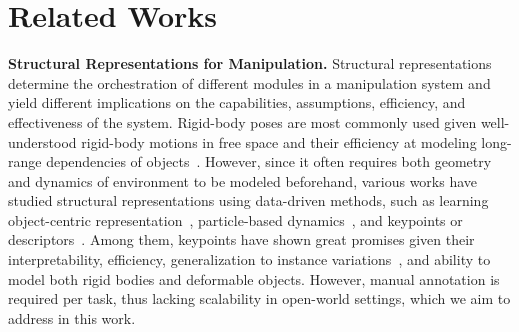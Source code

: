 \section{Related Works}
\label{sec:related}

\textbf{Structural Representations for Manipulation.}
Structural representations determine the orchestration of different modules in a manipulation system and yield different implications on the capabilities, assumptions, efficiency, and effectiveness of the system.
Rigid-body poses are most commonly used given well-understood rigid-body motions in free space and their efficiency at modeling long-range dependencies of objects~\cite{kaelbling2010hierarchical,kaelbling2013integrated,srivastava2014combined,byravan2017se3,dantam2018incremental,migimatsu2020object,garrett2021integrated,curtis2022long,labbe2022megapose,tyree20226,pan2023tax,wen2023foundationpose}.
However, since it often requires both geometry and dynamics of environment to be modeled beforehand, various works have studied structural representations using data-driven methods, such as learning object-centric representation~\cite{lenz2015deepmpc,chang2016compositional,battaglia2016interaction,sanchez2018graph,jang2018grasp2vec,tremblay2018deep,xu2019densephysnet,mao2019neuro,burgess2019monet,hewing2020learning,locatello2020object,heravi2023visuomotor,zhu2023learning,yuan2022sornet,cheng2023nod,hsu2024s}, particle-based dynamics~\cite{li2018learning,lin2022planning,wang2023dynamic,shi2023robocook,lin2022learning,abou2024physically,bauer2024doughnet}, and keypoints or descriptors~\cite{schmidt2016self,florence2018dense,manuelli2019kpam,kulkarni2019unsupervised,qin2020keto,sundaresan2020learning,manuelli2020keypoints,chen2021unsupervised,simeonov2022neural,simeonov2023se,vecerik2023robotap,chun2023local,bahl2023affordances,wen2023any,bharadhwaj2024track2act}.
Among them, keypoints have shown great promises given their interpretability, efficiency, generalization to instance variations~\cite{manuelli2019kpam}, and ability to model both rigid bodies and deformable objects.
However, manual annotation is required per task, thus lacking scalability in open-world settings, which we aim to address in this work.






